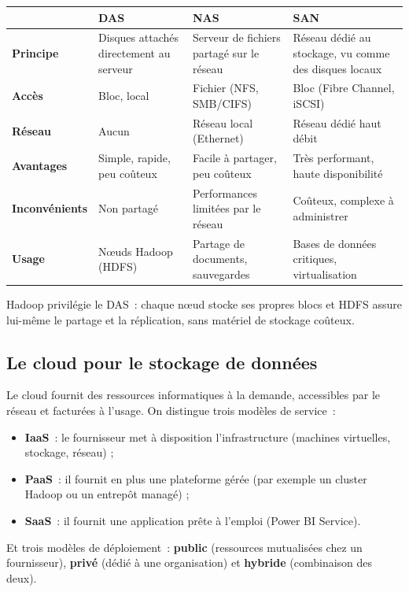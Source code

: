 \begin{center}
\begin{tabularx}{\textwidth}{>{\bfseries}l X X X}
\toprule
 & DAS & NAS & SAN \\
\midrule
Principe & Disques attachés directement au serveur & Serveur de fichiers partagé sur le réseau & Réseau dédié au stockage, vu comme des disques locaux \\
Accès & Bloc, local & Fichier (NFS, SMB/CIFS) & Bloc (Fibre Channel, iSCSI) \\
Réseau & Aucun & Réseau local (Ethernet) & Réseau dédié haut débit \\
Avantages & Simple, rapide, peu coûteux & Facile à partager, peu coûteux & Très performant, haute disponibilité \\
Inconvénients & Non partagé & Performances limitées par le réseau & Coûteux, complexe à administrer \\
Usage & Nœuds Hadoop (HDFS) & Partage de documents, sauvegardes & Bases de données critiques, virtualisation \\
\bottomrule
\end{tabularx}
\end{center}

\noindent Hadoop privilégie le DAS~: chaque nœud stocke ses propres blocs et HDFS assure lui-même le partage et la réplication, sans matériel de stockage coûteux.

\subsection{Le cloud pour le stockage de données}

\noindent Le cloud fournit des ressources informatiques à la demande, accessibles par le réseau et facturées à l'usage. On distingue trois modèles de service~:
\begin{itemize}
	\item \textbf{IaaS}~: le fournisseur met à disposition l'infrastructure (machines virtuelles, stockage, réseau) ;
	\item \textbf{PaaS}~: il fournit en plus une plateforme gérée (par exemple un cluster Hadoop ou un entrepôt managé) ;
	\item \textbf{SaaS}~: il fournit une application prête à l'emploi (Power BI Service).
\end{itemize}
Et trois modèles de déploiement~: \textbf{public} (ressources mutualisées chez un fournisseur), \textbf{privé} (dédié à une organisation) et \textbf{hybride} (combinaison des deux).

